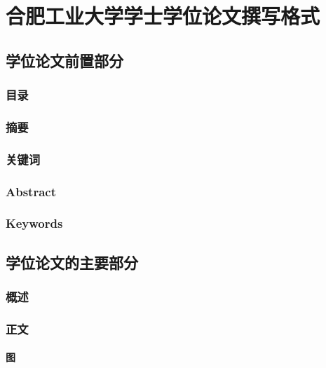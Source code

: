\chapter{合肥工业大学学士学位论文撰写格式}


\section{学位论文前置部分}

\subsection{目录}

\subsection{摘要}

\subsection{关键词}

\subsection{Abstract}

\subsection{Keywords}

\section{学位论文的主要部分}
\subsection{概述}

\subsection{正文}

\subsubsection{图}


